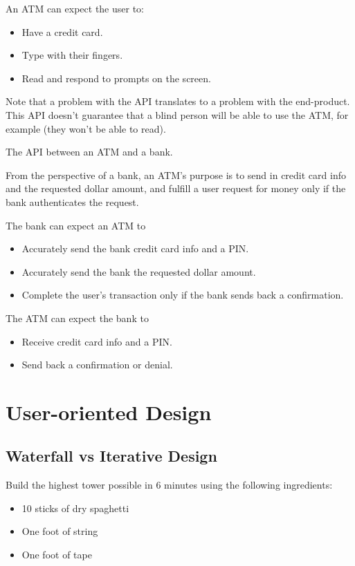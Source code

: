 An ATM can expect the user to:
\begin{itemize}
	\item Have a credit card.
	\item Type with their fingers.
	\item Read and respond to prompts on the screen.
\end{itemize}

Note that a problem with the API translates to a problem with the end-product. This API doesn't guarantee that a blind person will be able to use the ATM, for example (they won't be able to read). 

\begin{example}
The API between an ATM and a bank.
\end{example}

From the perspective of a bank, an ATM's purpose is to send in credit card info and the requested dollar amount, and fulfill a user request for money only if the bank authenticates the request. 

The bank can expect an ATM to
\begin{itemize}
	\item Accurately send the bank credit card info and a PIN.
	\item Accurately send the bank the requested dollar amount.
	\item Complete the user's transaction only if the bank sends back a confirmation.
\end{itemize}

The ATM can expect the bank to
\begin{itemize}
	\item Receive credit card info and a PIN.
	\item Send back a confirmation or denial.
\end{itemize}

\section{User-oriented Design}

\subsection{Waterfall vs Iterative Design}

\begin{example}
Build the highest tower possible in 6 minutes using the following ingredients:
\begin{itemize}
	\item 10 sticks of dry spaghetti
	\item One foot of string
	\item One foot of tape
\end{itemize}
\end{example}


